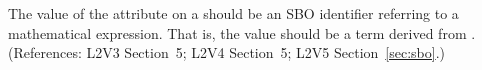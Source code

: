 The value of the  attribute on a \Delay should be an SBO
identifier referring to a mathematical expression.  That is, the value
should be a term derived from \sbomathformula.  (References: 
L2V3 Section~5; L2V4 Section~5; L2V5 Section~\ref{sec:sbo}.)
